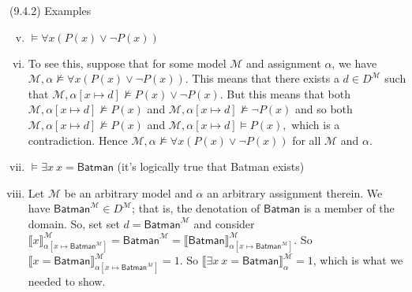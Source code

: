 \begin{frame}{(9.4.2) Examples}

\begin{enumerate}[(i)]

\setcounter{enumi}{4}

\item $\vDash \forall x(P(x)\lor \neg P(x))$
		
		\item[] To see this, suppose that for some model $\mathcal{M}$ and assignment $\alpha$, we have $\mathcal{M},\alpha\nvDash  \forall x(P(x)\lor \neg P(x))$. This means that there exists a $d\in D^\mathcal{M}$ such that $\mathcal{M},\alpha[x\mapsto d]\nvDash  P(x)\lor \neg P(x)$. But this means that both $\mathcal{M},\alpha[x\mapsto d]\nvDash  P(x)$ and $\mathcal{M},\alpha[x\mapsto d]\nvDash  \neg P(x)$ and so both $\mathcal{M},\alpha[x\mapsto d]\nvDash  P(x)$ and $\mathcal{M},\alpha[x\mapsto d]\vDash  P(x),$ which is a contradiction. Hence $\mathcal{M},\alpha\nvDash  \forall x(P(x)\lor \neg P(x))$ for all $\mathcal{M}$ and  $\alpha$.
		
		\item $\vDash\exists x~x=\mathsf{Batman}$ (it's logically true that Batman exists)
		
		\item[] Let $\mathcal{M}$ be an arbitrary model and $\alpha$ an arbitrary assignment therein. We have $\mathsf{Batman}^\mathcal{M}\in D^\mathcal{M}$; that is, the denotation of $\mathsf{Batman}$ is a member of the domain. So, set set $d=\mathsf{Batman}^\mathcal{M}$ and consider  $\llbracket x\rrbracket^\mathcal{M}_{\alpha[x\mapsto\mathsf{Batman}^\mathcal{M}]}=\mathsf{Batman}^\mathcal{M}=\llbracket\mathsf{Batman}\rrbracket^\mathcal{M}_{\alpha[x\mapsto\mathsf{Batman}^\mathcal{M}]}$. So $\llbracket x=\mathsf{Batman}\rrbracket^\mathcal{M}_{\alpha[x\mapsto\mathsf{Batman}^\mathcal{M}]}=1$. So $\llbracket\exists x~x=\mathsf{Batman}\rrbracket^\mathcal{M}_\alpha=1$, which is what we needed to show.		
		\end{enumerate}

\end{frame}

